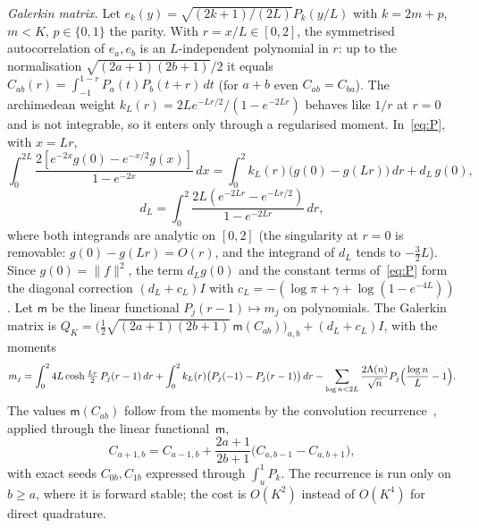 \documentclass[11pt]{amsart}
\theoremstyle{definition}
\theoremstyle{remark}
\numberwithin{equation}{section}
\begin{document}
\emph{Galerkin matrix.} Let $e_k(y)=\sqrt{(2k+1)/(2L)}P_k(y/L)$ with $k=2m+p$, $m<K$, $p\in\{0,1\}$ the parity. With $r=x/L\in[0,2]$, the symmetrised autocorrelation of $e_a,e_b$ is an $L$-independent polynomial in $r$: up to the normalisation $\sqrt{(2a+1)(2b+1)}/2$ it equals $C_{ab}(r)=\int_{-1}^{1-r}P_a(t)P_b(t+r)\,dt$ (for $a+b$ even $C_{ab}=C_{ba}$). The archimedean weight $k_L(r)=2Le^{-Lr/2}/(1-e^{-2Lr})$ behaves like $1/r$ at $r=0$ and is not integrable, so it enters only through a regularised moment. In~\eqref{eq:P}, with $x=Lr$,
\[
\int_0^{2L}\frac{2[e^{-2x}g(0)-e^{-x/2}g(x)]}{1-e^{-2x}}\,dx=\int_0^2k_L(r)\bigl(g(0)-g(Lr)\bigr)\,dr+d_L\,g(0),
\]
\[
d_L=\int_0^2\frac{2L(e^{-2Lr}-e^{-Lr/2})}{1-e^{-2Lr}}\,dr,
\]
where both integrands are analytic on $[0,2]$ (the singularity at $r=0$ is removable: $g(0)-g(Lr)=O(r)$, and the integrand of $d_L$ tends to $-\tfrac32L$). Since $g(0)=\|f\|^2$, the term $d_Lg(0)$ and the constant terms of~\eqref{eq:P} form the diagonal correction $(d_L+c_L)I$ with $c_L=-(\log\pi+\gamma+\log(1-e^{-4L}))$. Let $\mathsf m$ be the linear functional $P_j(r-1)\mapsto m_j$ on polynomials. The Galerkin matrix is $Q_K=\bigl(\tfrac12\sqrt{(2a+1)(2b+1)}\,\mathsf m(C_{ab})\bigr)_{a,b}+(d_L+c_L)I$, with the moments
\[
m_j=\int_0^24L\cosh\tfrac{Lr}2\,P_j(r-1)\,dr+\int_0^2k_L(r)\bigl(P_j(-1)-P_j(r-1)\bigr)\,dr-\sum_{\log n<2L}\frac{2\Lambda(n)}{\sqrt n}P_j\Bigl(\frac{\log n}L-1\Bigr).
\]
The values $\mathsf m(C_{ab})$ follow from the moments by the convolution recurrence~\cite{HaleTownsend}, applied through the linear functional~$\mathsf m$,
\[
C_{a+1,b}=C_{a-1,b}+\frac{2a+1}{2b+1}\bigl(C_{a,b-1}-C_{a,b+1}\bigr),
\]
with exact seeds $C_{0b},C_{1b}$ expressed through $\int_u^1P_k$. The recurrence is run only on $b\ge a$, where it is forward stable; the cost is $O(K^2)$ instead of $O(K^4)$ for direct quadrature.
\end{document}
